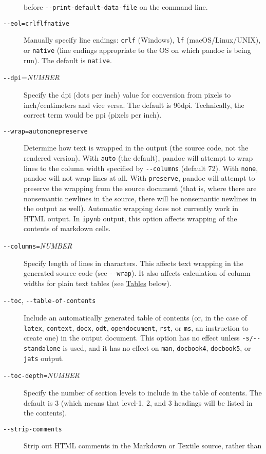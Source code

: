 \documentclass[
]{article}
\begin{document}
\begin{description}
before \texttt{-\/-print-default-data-file} on the command line.
\item[\texttt{-\/-eol=crlf}\textbar{}\texttt{lf}\textbar{}\texttt{native}]
Manually specify line endings: \texttt{crlf} (Windows), \texttt{lf}
(macOS/Linux/UNIX), or \texttt{native} (line endings appropriate to the
OS on which pandoc is being run). The default is \texttt{native}.
\item[\texttt{-\/-dpi}=\emph{NUMBER}]
Specify the dpi (dots per inch) value for conversion from pixels to
inch/centimeters and vice versa. The default is 96dpi. Technically, the
correct term would be ppi (pixels per inch).
\item[\texttt{-\/-wrap=auto}\textbar{}\texttt{none}\textbar{}\texttt{preserve}]
Determine how text is wrapped in the output (the source code, not the
rendered version). With \texttt{auto} (the default), pandoc will attempt
to wrap lines to the column width specified by \texttt{-\/-columns}
(default 72). With \texttt{none}, pandoc will not wrap lines at all.
With \texttt{preserve}, pandoc will attempt to preserve the wrapping
from the source document (that is, where there are nonsemantic newlines
in the source, there will be nonsemantic newlines in the output as
well). Automatic wrapping does not currently work in HTML output. In
\texttt{ipynb} output, this option affects wrapping of the contents of
markdown cells.
\item[\texttt{-\/-columns=}\emph{NUMBER}]
Specify length of lines in characters. This affects text wrapping in the
generated source code (see \texttt{-\/-wrap}). It also affects
calculation of column widths for plain text tables (see
\protect\hyperlink{tables}{Tables} below).
\item[\texttt{-\/-toc}, \texttt{-\/-table-of-contents}]
Include an automatically generated table of contents (or, in the case of
\texttt{latex}, \texttt{context}, \texttt{docx}, \texttt{odt},
\texttt{opendocument}, \texttt{rst}, or \texttt{ms}, an instruction to
create one) in the output document. This option has no effect unless
\texttt{-s/-\/-standalone} is used, and it has no effect on
\texttt{man}, \texttt{docbook4}, \texttt{docbook5}, or \texttt{jats}
output.
\item[\texttt{-\/-toc-depth=}\emph{NUMBER}]
Specify the number of section levels to include in the table of
contents. The default is 3 (which means that level-1, 2, and 3 headings
will be listed in the contents).
\item[\texttt{-\/-strip-comments}]
Strip out HTML comments in the Markdown or Textile source, rather than

\end{description}
\end{document}
